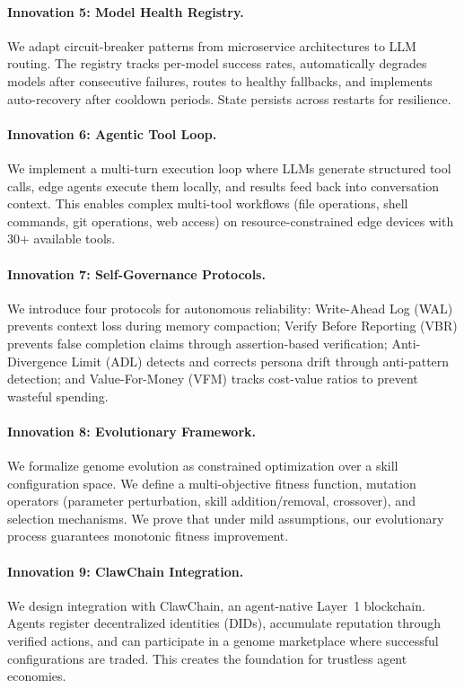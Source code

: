 \documentclass{article}
\begin{document}
\paragraph{Innovation 5: Model Health Registry.} We adapt circuit-breaker patterns from microservice architectures to LLM routing. The registry tracks per-model success rates, automatically degrades models after consecutive failures, routes to healthy fallbacks, and implements auto-recovery after cooldown periods. State persists across restarts for resilience.

\paragraph{Innovation 6: Agentic Tool Loop.} We implement a multi-turn execution loop where LLMs generate structured tool calls, edge agents execute them locally, and results feed back into conversation context. This enables complex multi-tool workflows (file operations, shell commands, git operations, web access) on resource-constrained edge devices with 30+ available tools.

\paragraph{Innovation 7: Self-Governance Protocols.} We introduce four protocols for autonomous reliability: Write-Ahead Log (WAL) prevents context loss during memory compaction; Verify Before Reporting (VBR) prevents false completion claims through assertion-based verification; Anti-Divergence Limit (ADL) detects and corrects persona drift through anti-pattern detection; and Value-For-Money (VFM) tracks cost-value ratios to prevent wasteful spending.

\paragraph{Innovation 8: Evolutionary Framework.} We formalize genome evolution as constrained optimization over a skill configuration space. We define a multi-objective fitness function, mutation operators (parameter perturbation, skill addition/removal, crossover), and selection mechanisms. We prove that under mild assumptions, our evolutionary process guarantees monotonic fitness improvement.

\paragraph{Innovation 9: ClawChain Integration.} We design integration with ClawChain, an agent-native Layer~1 blockchain. Agents register decentralized identities (DIDs), accumulate reputation through verified actions, and can participate in a genome marketplace where successful configurations are traded. This creates the foundation for trustless agent economies.
\end{document}
